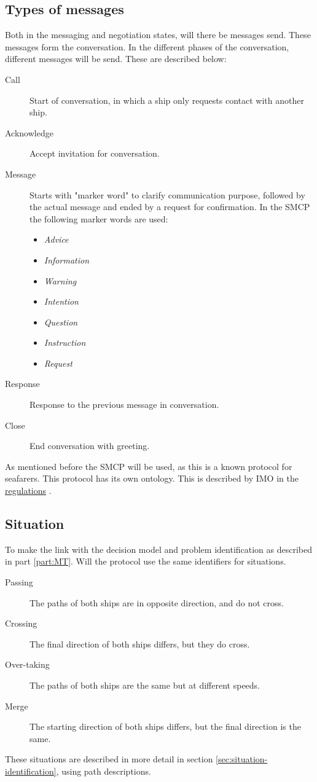 \subsection{Types of messages}
Both in the messaging and negotiation states, will there be messages send. These messages form the conversation. In the different phases of the conversation, different messages will be send. These are described below:
\begin{description}
	\item [Call] Start of conversation, in which a ship only requests contact with another ship.
	\item [Acknowledge] Accept invitation for conversation.
	\item [Message] Starts with "marker word" to clarify communication purpose, followed by the actual message and ended by a request for confirmation. In the \ac{SMCP} the following marker words are used:
	\begin{itemize}
		\item \emph{Advice}
		\item \emph{Information}
		\item \emph{Warning}
		\item \emph{Intention}
		\item \emph{Question}
		\item \emph{Instruction}
		\item \emph{Request}
	\end{itemize}
	\item [Response] Response to the previous message in conversation.
	\item [Close] End conversation with greeting.
\end{description}
As mentioned before the \acf{SMCP} will be used, as this is a known protocol for seafarers. This protocol has its own ontology. This is described by \ac{IMO} in the \href{https://puc.overheid.nl/doc/PUC_1418_14/1/#16830}{regulations} \cite{IMO2000}.

\subsection{Situation}
To make the link with the decision model and problem identification as described in part \ref{part:MT}. Will the protocol use the same identifiers for situations. 
\begin{description}
	\item [Passing] The paths of both ships are in opposite direction, and do not cross.
	\item [Crossing]The final direction of both ships differs, but they do cross.
	\item [Over-taking] The paths of both ships are the same but at different speeds.
	\item [Merge] The starting direction of both ships differs, but the final direction is the same.
\end{description}
These situations are described in more detail in section \ref{sec:situation-identification}, using path descriptions.
